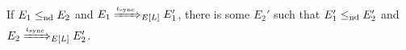 
\begin{lem}
\label{lem:internal-sync-control-lifting}
If $E_1 \leq_{\text{nd}} E_2$ and $E_1 \ctrlstep[\iotasync] E_1'$, there is some $E_2'$ such that $E_1' \leq_{\text{nd}} E_2'$ and $E_2 \ctrlstep[\iotasync] E_2'$.
\end{lem}

